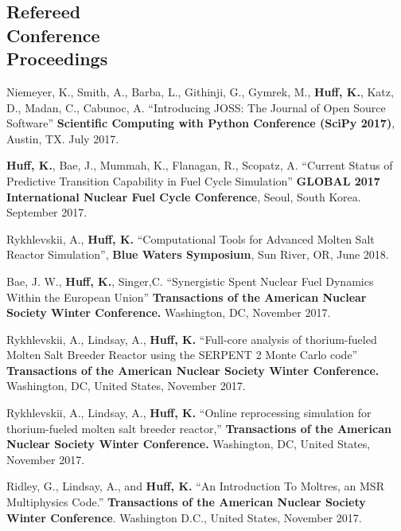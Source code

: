 \documentclass[margin,line]{resume}
\begin{document}
\begin{resume}
    \section{\mysidestyle Refereed\\Conference\\Proceedings}
    \begin{bibenum}
    \item Niemeyer, K., Smith, A., Barba, L., Githinji, G., Gymrek, M., 
            \textbf{Huff, K.}, Katz, D., Madan, C., Cabunoc, A. ``Introducing 
            JOSS: The Journal of Open Source Software'' \textbf{Scientific 
            Computing with Python Conference (SciPy 2017)}, Austin, TX. July 
            2017.
    \item \textbf{Huff, K.}, Bae, J., Mummah, K., Flanagan, R., Scopatz, A.
            ``Current Status of Predictive Transition Capability in Fuel Cycle 
            Simulation'' \textbf{GLOBAL 2017 International Nuclear Fuel Cycle 
            Conference}, Seoul, South Korea. September 2017.
    \item Rykhlevskii, A., \textbf{Huff, K.} ``Computational Tools for Advanced 
            Molten Salt Reactor Simulation'', \textbf{Blue Waters Symposium}, 
            Sun River, OR, June 2018.
    \item Bae, J. W., \textbf{Huff, K.}, Singer,C. ``Synergistic Spent Nuclear Fuel Dynamics Within the European Union'' 
            \textbf{Transactions of the American Nuclear Society Winter Conference.} 
            Washington, DC, November 2017.  
    \item Rykhlevskii, A., Lindsay, A., \textbf{Huff, K.} ``Full-core analysis of thorium-fueled Molten Salt Breeder Reactor using the SERPENT 2 Monte Carlo code'' 
            \textbf{Transactions of the American Nuclear Society Winter Conference.} 
            Washington, DC, United States, November 2017.
    \item Rykhlevskii, A., Lindsay, A., \textbf{Huff, K.} ``Online reprocessing simulation for thorium-fueled molten salt breeder reactor,'' 
            \textbf{Transactions of the American Nuclear Society Winter Conference.} 
            Washington, DC, United States, November 2017.
    \item Ridley, G., Lindsay, A., and \textbf{Huff, K.} ``An 
            Introduction To Moltres, an MSR Multiphysics Code.'' \textbf{Transactions 
            of the American Nuclear Society Winter Conference}. Washington 
            D.C., United States, November 2017.
    \end{bibenum}


\end{resume}
\end{document}
